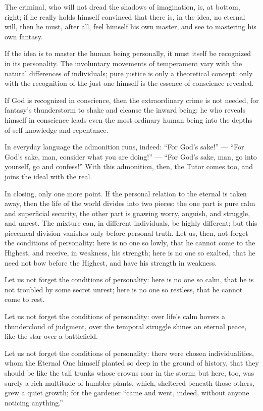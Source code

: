 \documentclass[12pt,a4paper]{book}
\begin{document}
The criminal, who will not dread the shadows of imagination, is, at bottom, right; if he really holds himself convinced that there is, in the idea, no eternal will, then he must, after all, feel himself his own master, and see to mastering his own fantasy.

If the idea is to master the human being personally, it must itself be recognized in its personality. The involuntary movements of temperament vary with the natural differences of individuals; pure justice is only a theoretical concept: only with the recognition of the just one himself is the essence of conscience revealed.

If God is recognized in conscience, then the extraordinary crime is not needed, for fantasy's thunderstorm to shake and cleanse the inward being: he who reveals himself in conscience leads even the most ordinary human being into the depths of self-knowledge and repentance.

In everyday language the admonition runs, indeed: ``For God's sake!'' --- ``For God's sake, man, consider what you are doing!'' --- ``For God's sake, man, go into yourself, go and confess!'' With this admonition, then, the Tutor comes too, and joins the ideal with the real.

In closing, only one more point. If the personal relation to the eternal is taken away, then the life of the world divides into two pieces: the one part is pure calm and superficial security, the other part is gnawing worry, anguish, and struggle, and unrest. The mixture can, in different individuals, be highly different; but this piecemeal division vanishes only before personal truth.
Let us, then, not forget the conditions of personality: here is no one so lowly, that he cannot come to the Highest, and receive, in weakness, his strength; here is no one so exalted, that he need not bow before the Highest, and have his strength in weakness.

Let us not forget the conditions of personality: here is no one so calm, that he is not troubled by some secret unrest; here is no one so restless, that he cannot come to rest.

Let us not forget the conditions of personality: over life's calm hovers a thundercloud of judgment, over the temporal struggle shines an eternal peace, like the star over a battlefield.

Let us not forget the conditions of personality: there were chosen individualities, whom the Eternal One himself planted so deep in the ground of history, that they should be like the tall trunks whose crowns roar in the storm; but here, too, was surely a rich multitude of humbler plants, which, sheltered beneath those others, grew a quiet growth; for the gardener ``came and went, indeed, without anyone noticing anything.''
\end{document}
